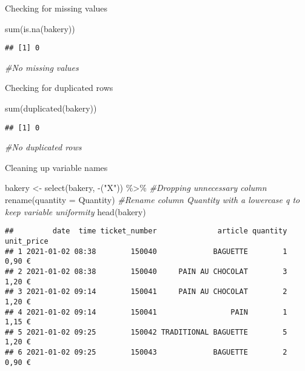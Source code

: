 \documentclass[
]{article}
\newenvironment{Shaded}{\begin{snugshade}}{\end{snugshade}}
\newcommand{\AttributeTok}[1]{\textcolor[rgb]{0.77,0.63,0.00}{#1}}
\newcommand{\CommentTok}[1]{\textcolor[rgb]{0.56,0.35,0.01}{\textit{#1}}}
\newcommand{\FunctionTok}[1]{\textcolor[rgb]{0.00,0.00,0.00}{#1}}
\newcommand{\NormalTok}[1]{#1}
\newcommand{\OtherTok}[1]{\textcolor[rgb]{0.56,0.35,0.01}{#1}}
\newcommand{\SpecialCharTok}[1]{\textcolor[rgb]{0.00,0.00,0.00}{#1}}
\newcommand{\StringTok}[1]{\textcolor[rgb]{0.31,0.60,0.02}{#1}}
\begin{document}
Checking for missing values

\begin{Shaded}
\begin{Highlighting}[]
\FunctionTok{sum}\NormalTok{(}\FunctionTok{is.na}\NormalTok{(bakery))}
\end{Highlighting}
\end{Shaded}

\begin{verbatim}
## [1] 0
\end{verbatim}

\begin{Shaded}
\begin{Highlighting}[]
\CommentTok{\#No missing values}
\end{Highlighting}
\end{Shaded}

Checking for duplicated rows

\begin{Shaded}
\begin{Highlighting}[]
\FunctionTok{sum}\NormalTok{(}\FunctionTok{duplicated}\NormalTok{(bakery))}
\end{Highlighting}
\end{Shaded}

\begin{verbatim}
## [1] 0
\end{verbatim}

\begin{Shaded}
\begin{Highlighting}[]
\CommentTok{\#No duplicated rows}
\end{Highlighting}
\end{Shaded}

Cleaning up variable names

\begin{Shaded}
\begin{Highlighting}[]
\NormalTok{bakery }\OtherTok{\textless{}{-}} \FunctionTok{select}\NormalTok{(bakery, }\SpecialCharTok{{-}}\NormalTok{(}\StringTok{"X"}\NormalTok{)) }\SpecialCharTok{\%\textgreater{}\%} \CommentTok{\#Dropping unnecessary column}
  \FunctionTok{rename}\NormalTok{(}\AttributeTok{quantity =}\NormalTok{ Quantity) }\CommentTok{\#Rename column Quantity with a lowercase q to keep variable uniformity}
\FunctionTok{head}\NormalTok{(bakery)}
\end{Highlighting}
\end{Shaded}

\begin{verbatim}
##         date  time ticket_number              article quantity unit_price
## 1 2021-01-02 08:38        150040             BAGUETTE        1     0,90 €
## 2 2021-01-02 08:38        150040     PAIN AU CHOCOLAT        3     1,20 €
## 3 2021-01-02 09:14        150041     PAIN AU CHOCOLAT        2     1,20 €
## 4 2021-01-02 09:14        150041                 PAIN        1     1,15 €
## 5 2021-01-02 09:25        150042 TRADITIONAL BAGUETTE        5     1,20 €
## 6 2021-01-02 09:25        150043             BAGUETTE        2     0,90 €
\end{verbatim}
\end{document}
